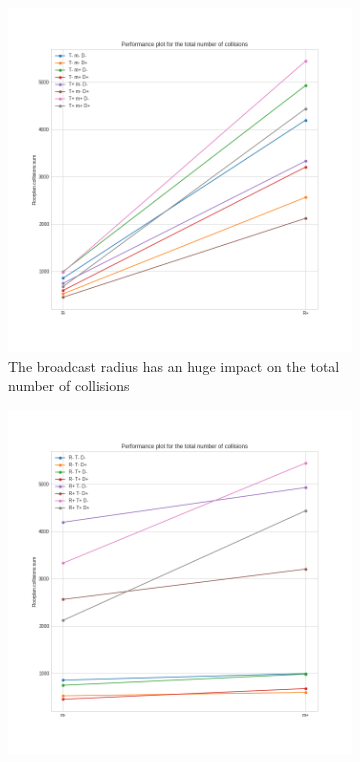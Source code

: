 \begin{figure}[htb]
	\centering
	\begin{subfigure}[b]{0.38\textwidth}
		\centering
		\includegraphics[width=\textwidth]{img/hd/collisions-R-perfplot}
		\caption{The broadcast radius has an huge impact on the total
		number of collisions}\label{subfig:hdperfcollisionsR}
	\end{subfigure}
	\begin{subfigure}[b]{0.38\textwidth}
		\centering
		\includegraphics[width=\textwidth]{img/hd/collisions-m-perfplot}

\end{subfigure}
\end{figure}
